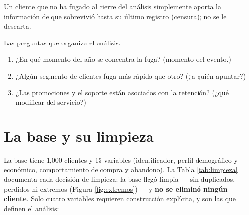 \documentclass[
  10pt,
  titlepage]{article}
\providecommand{\tightlist}{%
  \setlength{\itemsep}{0pt}\setlength{\parskip}{0pt}}
\begin{document}
Un cliente que no ha fugado al cierre del análisis
simplemente aporta la información de que sobrevivió hasta su último registro
(censura); no se le descarta.

Las preguntas que organiza el análisis:

\begin{enumerate}
\def\labelenumi{\arabic{enumi}.}
\tightlist
\item
  ¿En qué momento del año se concentra la fuga? (momento del evento.)
\item
  ¿Algún segmento de clientes fuga más rápido que otro? (¿a quién apuntar?)
\item
  ¿Las promociones y el soporte están asociados con la retención? (¿qué modificar del servicio?)
\end{enumerate}

\section{La base y su limpieza}\label{la-base-y-su-limpieza}

La base tiene 1,000 clientes y 15 variables
(identificador, perfil demográfico y económico, comportamiento de compra y abandono).
La Tabla \ref{tab:limpieza} documenta cada decisión de limpieza: la base llegó
limpia --- sin duplicados, perdidos ni extremos (Figura \ref{fig:extremos}) --- y
\textbf{no se eliminó ningún cliente}. Solo cuatro variables requieren construcción
explícita, y son las que definen el análisis:

\begingroup\fontsize{10}{12}\selectfont
\end{document}
